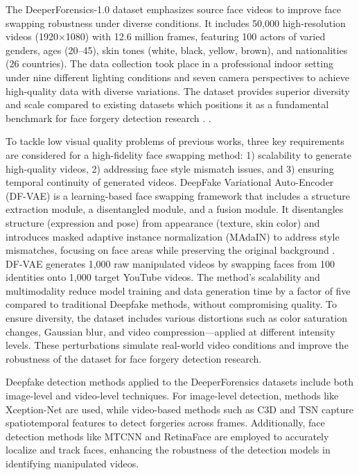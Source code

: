 \documentclass{article} %
\begin{document}
The DeeperForensics-1.0 dataset emphasizes source face videos to improve face swapping robustness under diverse conditions. It includes 50,000 high-resolution videos (1920×1080) with 12.6 million frames, featuring 100 actors of varied genders, ages (20–45), skin tones (white, black, yellow, brown), and nationalities (26 countries). The data collection took place in a professional indoor setting under nine different lighting conditions and seven camera perspectives to achieve high-quality data with diverse variations. The dataset provides superior diversity and scale compared to existing datasets which positions it as a fundamental benchmark for face forgery detection research \cite{jiang2020deeperforensics}. .

To tackle low visual quality problems of previous works, three key requirements are considered for a high-fidelity face swapping method: 1) scalability to generate high-quality videos, 2) addressing face style mismatch issues, and 3) ensuring temporal continuity of generated videos. DeepFake Variational Auto-Encoder (DF-VAE) is a learning-based face swapping framework that includes a structure extraction module, a disentangled module, and a fusion module. It disentangles structure (expression and pose) from appearance (texture, skin color) and introduces masked adaptive instance normalization (MAdaIN) to address style mismatches, focusing on face areas while preserving the original background \cite{jiang2020deeperforensics}. DF-VAE generates 1,000 raw manipulated videos by swapping faces from 100 identities onto 1,000 target YouTube videos. The method's scalability and multimodality reduce model training and data generation time by a factor of five compared to traditional Deepfake methods, without compromising quality. To ensure diversity, the dataset includes various distortions such as color saturation changes, Gaussian blur, and video compression—applied at different intensity levels. These perturbations simulate real-world video conditions and improve the robustness of the dataset for face forgery detection research.


Deepfake detection methods applied to the DeeperForensics datasets include both image-level and video-level techniques. For image-level detection, methods like Xception-Net are used, while video-based methods such as C3D\cite{Tran_2015} and TSN\cite{Wang_2016} capture spatiotemporal features to detect forgeries across frames. Additionally, face detection methods like MTCNN and RetinaFace are employed to accurately localize and track faces, enhancing the robustness of the detection models in identifying manipulated videos.
\end{document}

